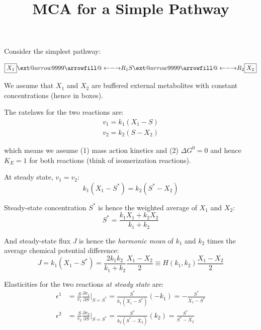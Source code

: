 \documentclass{article}
\makeatletter
\newcommand\xleftrightarrow[2][]{%
  \ext@arrow 9999{\longleftrightarrowfill@}{#1}{#2}}
\newcommand\longleftrightarrowfill@{%
  \arrowfill@\leftarrow\relbar\rightarrow}
\makeatother
\begin{document}
\title{MCA for a Simple Pathway}
\maketitle

Consider the simplest pathway:

\begin{equation}
    \label{diagram}
    \boxed{X_1} \xleftrightarrow{R_1} S \xleftrightarrow{R_2} \boxed{X_2}
\end{equation}

We assume that $X_1$ and $X_2$ are buffered external metabolites with constant concentrations (hence in boxes).

The ratelaws for the two reactions are:
\begin{equation}
    \label{ratelaw}
    \begin{aligned}
        v_1 = k_1 (X_1 - S) \\
        v_2 = k_2 (S - X_2)
    \end{aligned}
\end{equation}

which means we assume (1) mass action kinetics and (2) $\Delta G^0=0$ and hence $K_E=1$ for both reactions (think of isomerization reactions).

At steady state, $v_1=v_2$:
\begin{equation}
    k_1(X_1 - S^*)= k_2 (S^* - X_2)
\end{equation}

Steady-state concentration $S^*$ is hence the weighted average of $X_1$ and $X_2$:
\begin{equation}
    \label{ssconcn}
     S^* = \frac{k_1 X_1 + k_2 X_2}{k_1+k_2}
\end{equation}

And steady-state flux $J$ is hence the \textit{harmonic mean} of $k_1$ and $k_2$ times the average chemical potential difference:
\begin{equation}
    \label{ssflux}
    J = k_1(X_1-S^*) = \frac{2 k_1 k_2}{k_1+k_2} \frac{X_1-X_2}{2} \equiv H(k_1, k_2) \frac{X_1-X_2}{2}
\end{equation}

Elasticities for the two reactions \textit{at steady state} are:
\begin{align}
    \label{elasticity}
    \epsilon^1 &= \frac{S}{v_1}\frac{\partial v_1}{\partial S} \Bigr|_{S=S^*} =\frac{S^*}{k_1(X_1-S^*)}(-k_1) = -\frac{S^*}{X_1-S^*} \\
    \epsilon^2 &= \frac{S}{v_2}\frac{\partial v_2}{\partial S} \Bigr|_{S=S^*} =\frac{S^*}{k_2(S^*-X_2)}(k_2) = \frac{S^*}{S^*-X_2}
\end{align}
\end{document}

